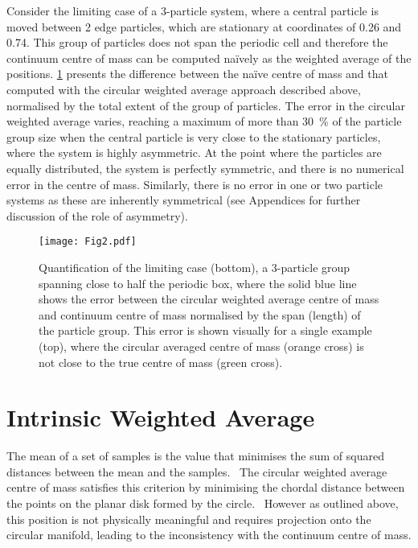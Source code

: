 \documentclass[reprint,superscriptaddress,nobibnotes,amsmath,amssymb,aip]{revtex4-2}
\begin{document}
Consider the limiting case of a 3-particle system, where a central particle is moved between 2 edge particles, which are stationary at coordinates of 0.26 and 0.74. 
This group of particles does not span the periodic cell and therefore the continuum centre of mass can be computed naïvely as the weighted average of the positions. 
\cref{fig:error_quantification} presents the difference between the naïve centre of mass and that computed with the circular weighted average approach described above, normalised by the total extent of the group of particles. 
The error in the circular weighted average varies, reaching a maximum of more than \SI{30}{\percent} of the particle group size when the central particle is very close to the stationary particles, where the system is highly asymmetric. 
At the point where the particles are equally distributed, the system is perfectly symmetric, and there is no numerical error in the centre of mass. 
Similarly, there is no error in one or two particle systems as these are inherently symmetrical (see Appendices for further discussion of the role of asymmetry). 
%
\begin{figure}
    \centering
    \texttt{[image: Fig2.pdf]}
    \caption{Quantification of the limiting case (bottom), a 3-particle group spanning close to half the periodic box, where the solid blue line shows the error between the circular weighted average centre of mass and continuum centre of mass normalised by the span (length) of the particle group.
    This error is shown visually for a single example (top), where the circular averaged centre of mass (orange cross) is not close to the true centre of mass (green cross).}
    \label{fig:error_quantification}
\end{figure}
%

\section{Intrinsic Weighted Average}

The mean of a set of samples is the value that minimises the sum of squared distances between the mean and the samples.~\cite{neilsen_matrix_2012}
The circular weighted average centre of mass satisfies this criterion by minimising the chordal distance between the points on the planar disk formed by the circle.~\cite{hotz_non-asymptotic_2016}
However as outlined above, this position is not physically meaningful and requires projection onto the circular manifold, leading to the inconsistency with the continuum centre of mass.
\end{document}
